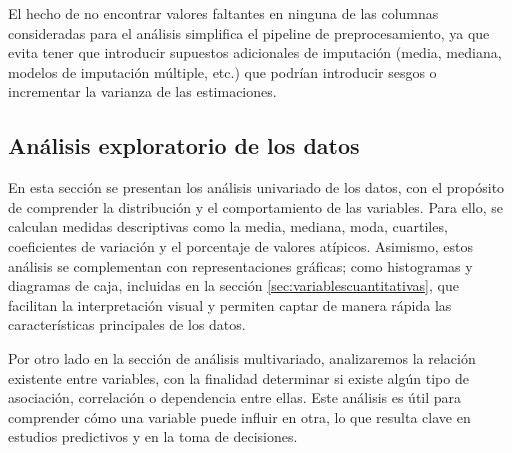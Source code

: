 El hecho de no encontrar valores faltantes en ninguna de las columnas consideradas para el análisis simplifica el pipeline de preprocesamiento, ya que evita tener que introducir supuestos adicionales de imputación (media, mediana, modelos de imputación múltiple, etc.) que podrían introducir sesgos o incrementar la varianza de las estimaciones.

\subsection{Análisis exploratorio de los datos}
En esta sección se presentan los análisis univariado de los datos, con el propósito de comprender la distribución y el comportamiento de las variables. Para ello, se calculan medidas descriptivas como la media, mediana, moda, cuartiles, coeficientes de variación y el porcentaje de valores atípicos. Asimismo, estos análisis se complementan con representaciones gráficas; como histogramas y diagramas de caja, incluidas en la sección \ref{sec:variablescuantitativas}, que facilitan la interpretación visual y permiten captar de manera rápida las características principales de los datos.

Por otro lado en la sección de análisis multivariado, analizaremos la relación existente entre variables, con la finalidad  determinar si existe algún tipo de asociación, correlación o dependencia entre ellas. Este análisis es útil para comprender cómo una variable puede influir en otra, lo que resulta clave en estudios predictivos y en la toma de decisiones.

